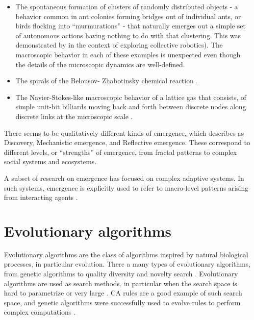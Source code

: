 \begin{itemize}
  \item The spontaneous formation of clusters of randomly distributed objects -
        a behavior common in ant colonies forming bridges out of individual
        ants, or birds flocking into ``murmurations'' - that naturally emerges
        out a simple set of autonomous actions having nothing to do with that
        clustering. This was demonstrated by
        \textcite{beckersFomLocalActions2000} in the context of exploring
        collective robotics). The macroscopic behavior in each of these examples
        is unexpected even though the details of the microscopic dynamics are
        well-defined.
  \item The spirals of the Belousov- Zhabotinsky chemical reaction
        \parencite{tysonBelousovZhabotinskiiReaction2013}.
  \item The Navier-Stokes-like macroscopic behavior of a lattice gas that
        consists, of simple unit-bit billiards moving back and forth between
        discrete nodes along discrete links at the microscopic scale
        \parencite{hasslacherDiscreteFluids1987}.
\end{itemize}

There seems to be qualitatively different kinds of emergence, which
\textcite{dehaanHowEmergenceArises2006} describes as Discovery, Mechanistic
emergence, and Reflective emergence. These correspond to different levels, or
``strengths'' of emergence, from fractal patterns to complex social systems and
ecosystems.

A subset of research on emergence has focused on complex adaptive systems. In
such systems, emergence is explicitly used to refer to macro-level patterns
arising from interacting agents \parencite{hollandEmergenceChaosOrder2000,
  kauffmanHomeUniverseSearch1995, langtonStudyingArtificialLife1986}.


\section{Evolutionary algorithms}\label{sec:evol-algor}
Evolutionary algorithms are the class of algorithms inspired by natural
biological processes, in particular evolution. There a many types of
evolutionary algorithms, from genetic algorithms to quality diversity and
novelty search \parencite{lehmanAbandoningObjectivesEvolution2011,
  lehmanEvolvingDiversityVirtual2011}. Evolutionary algorithms are used as
search methods, in particular when the search space is hard to parametrize or
very large \parencite{poliRelationsSearchEvolutionary1996}. \ac{CA} rules are a
good example of such search space, and genetic algorithms were successfully used
to evolve rules to perform complex computations
\parencite{mitchellEvolvingCellularAutomata1996}.


